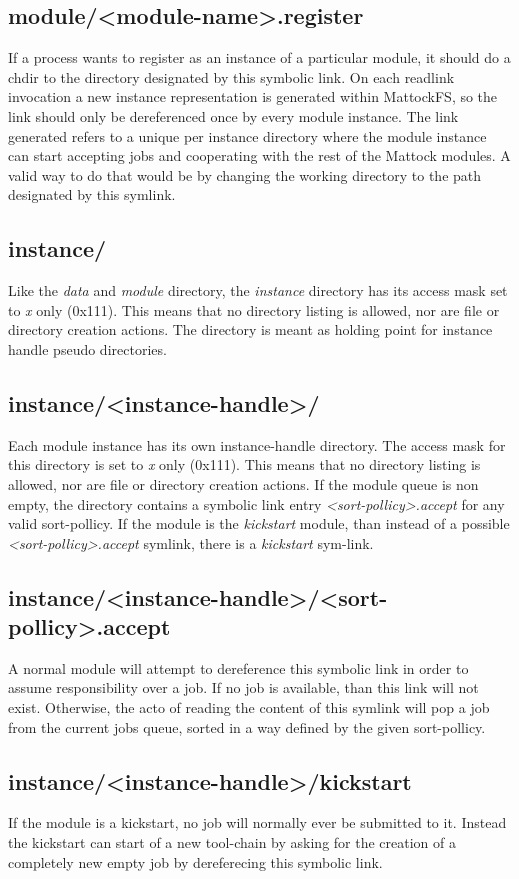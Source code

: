 \subsection{module/<module-name>.register}
If a process wants to register as an instance of a particular module, it should do a chdir to the directory designated by this symbolic link. On each readlink invocation a new instance representation is generated within MattockFS, so the link should only be dereferenced once by every module instance. The link generated refers to a unique per instance directory where the module instance can start accepting jobs and cooperating with the rest of the Mattock modules. A valid way to do that would be by changing the working directory to the path designated by this symlink.
\subsection{instance/}
Like the \emph{data} and \emph{module} directory, the \emph{instance} directory  has its access mask set to \emph{x} only (0x111). This means that no directory listing is allowed, nor are file or directory creation actions. The directory is meant as holding point for instance handle pseudo directories.
\subsection{instance/<instance-handle>/}
Each module instance has its own instance-handle directory. The  access mask for this directory is set to \emph{x} only (0x111).  This means that no directory listing is allowed, nor are file or directory creation actions. If the module queue is non empty, the directory contains a symbolic link entry \emph{<sort-pollicy>.accept} for any valid sort-pollicy. If the module is the \emph{kickstart} module, than instead of a possible \emph{<sort-pollicy>.accept} symlink, there is a \emph{kickstart} sym-link.
\subsection{instance/<instance-handle>/<sort-pollicy>.accept}
A normal module will attempt to dereference this symbolic link in order to assume responsibility over a job. If no job is available, than this link will not exist. Otherwise, the acto of reading the content of this symlink will pop a job from the current jobs queue, sorted in a way defined by the given sort-pollicy.
\subsection{instance/<instance-handle>/kickstart}
If the module is a kickstart, no job will normally ever be submitted to it. Instead the kickstart can start of a new tool-chain by asking for the creation of a completely new empty job by dereferecing this symbolic link.
